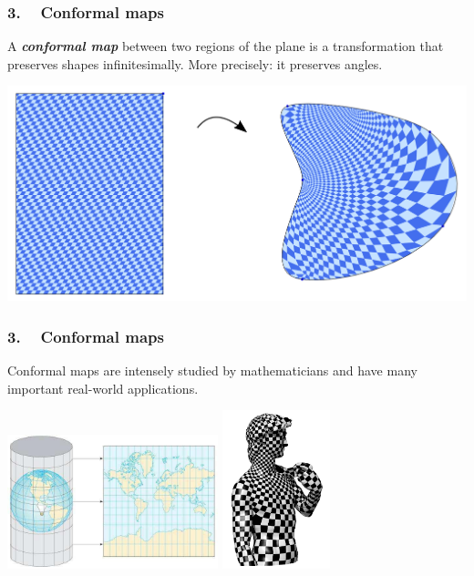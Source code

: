 
\begin{frame}
\frametitle{3. ~ Conformal maps}

A \emph{\bfseries conformal map} between two regions of the plane is a transformation that preserves shapes infinitesimally.
More precisely: it preserves angles.

\bigskip
\pause

\begin{center}
\includegraphics[width=\textwidth]{images/Conf1.pdf}
\end{center}

\end{frame}




\begin{frame}
\frametitle{3. ~ Conformal maps}

Conformal maps are intensely studied by mathematicians and have many important real-world applications.

\bigskip \pause

\begin{center}
\includegraphics[height=110pt]{images/mercator3.jpg} \hspace{30pt} \pause
\includegraphics[height=130pt]{images/david.png}
\end{center}

\end{frame}



